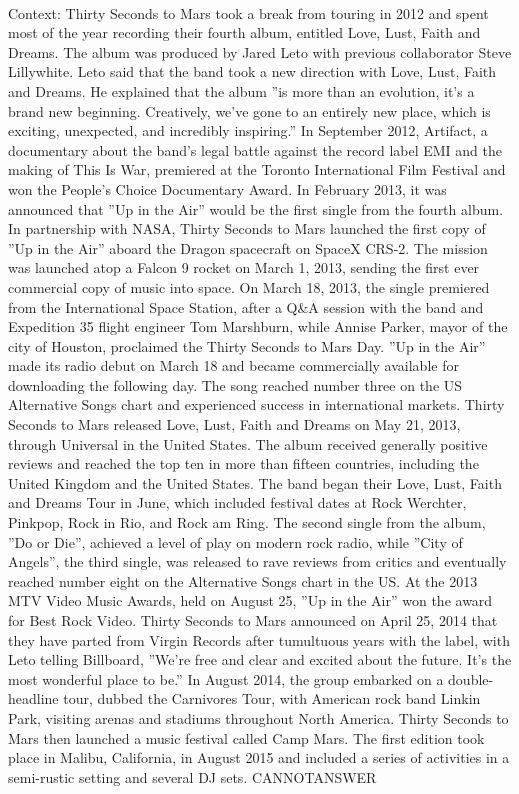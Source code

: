 \documentclass[11pt,a4paper, onecolumn]{article}
\begin{document}
\\ Context: Thirty Seconds to Mars took a break from touring in 2012 and spent most of the year recording their fourth album, entitled Love, Lust, Faith and Dreams. The album was produced by Jared Leto with previous collaborator Steve Lillywhite. Leto said that the band took a new direction with Love, Lust, Faith and Dreams. He explained that the album ''is more than an evolution, it's a brand new beginning. Creatively, we've gone to an entirely new place, which is exciting, unexpected, and incredibly inspiring.'' In September 2012, Artifact, a documentary about the band's legal battle against the record label EMI and the making of This Is War, premiered at the Toronto International Film Festival and won the People's Choice Documentary Award. In February 2013, it was announced that ''Up in the Air'' would be the first single from the fourth album. In partnership with NASA, Thirty Seconds to Mars launched the first copy of ''Up in the Air'' aboard the Dragon spacecraft on SpaceX CRS-2. The mission was launched atop a Falcon 9 rocket on March 1, 2013, sending the first ever commercial copy of music into space. On March 18, 2013, the single premiered from the International Space Station, after a Q&A session with the band and Expedition 35 flight engineer Tom Marshburn, while Annise Parker, mayor of the city of Houston, proclaimed the Thirty Seconds to Mars Day. ''Up in the Air'' made its radio debut on March 18 and became commercially available for downloading the following day. The song reached number three on the US Alternative Songs chart and experienced success in international markets. Thirty Seconds to Mars released Love, Lust, Faith and Dreams on May 21, 2013, through Universal in the United States. The album received generally positive reviews and reached the top ten in more than fifteen countries, including the United Kingdom and the United States. The band began their Love, Lust, Faith and Dreams Tour in June, which included festival dates at Rock Werchter, Pinkpop, Rock in Rio, and Rock am Ring. The second single from the album, ''Do or Die'', achieved a level of play on modern rock radio, while ''City of Angels'', the third single, was released to rave reviews from critics and eventually reached number eight on the Alternative Songs chart in the US. At the 2013 MTV Video Music Awards, held on August 25, ''Up in the Air'' won the award for Best Rock Video. Thirty Seconds to Mars announced on April 25, 2014 that they have parted from Virgin Records after tumultuous years with the label, with Leto telling Billboard, ''We're free and clear and excited about the future. It's the most wonderful place to be.'' In August 2014, the group embarked on a double-headline tour, dubbed the Carnivores Tour, with American rock band Linkin Park, visiting arenas and stadiums throughout North America. Thirty Seconds to Mars then launched a music festival called Camp Mars. The first edition took place in Malibu, California, in August 2015 and included a series of activities in a semi-rustic setting and several DJ sets. CANNOTANSWER
\end{document}

